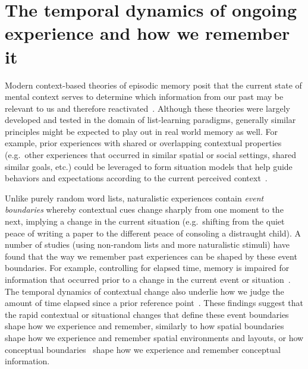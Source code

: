 \documentclass{article}
\begin{document}
\section*{The temporal dynamics of ongoing experience and how we remember it}
Modern context-based theories of episodic memory posit that the current state of mental context serves to determine which information from our past may be relevant to us and therefore reactivated~\citep[e.g.\ ][]{PolyEtal09}. Although these theories were largely developed and tested in the domain of list-learning paradigms, generally similar principles might be expected to play out in real world memory as well.  For example, prior experiences with shared or overlapping contextual properties (e.g.\ other experiences that occurred in similar spatial or social settings, shared similar goals, etc.) could be leveraged to form situation models that help guide behaviors and expectations according to the current perceived context~\citep{RangRitc12}.

Unlike purely random word lists, naturalistic experiences contain \textit{event boundaries} whereby contextual cues change sharply from one moment to the next, implying a change in the current situation (e.g.\ shifting from the quiet peace of writing a paper to the different peace of consoling a distraught child).  A number of studies (using non-random lists and more naturalistic stimuli) have found that the way we remember past experiences can be shaped by these event boundaries.  For example, controlling for elapsed time, memory is impaired for information that occurred prior to a change in the current event or situation~\citep[e.g.\ ][]{RadvCope06, SwalEtal09, SwalEtal11, EzzyDava11, MannEtal16}.  The temporal dynamics of contextual change also underlie how we judge the amount of time elapsed since a prior reference point~\citep{BlocReed78, SahaSmit14}.  These findings suggest that the rapid contextual or situational changes that define these event boundaries shape how we experience and remember, similarly to how spatial boundaries~\citep[e.g.\ environmental barriers;][]{McKeBuzs16, BrunEtal18} shape how we experience and remember spatial environments and layouts, or how conceptual boundaries~\citep[e.g.\ distinctions between semantic categories;][]{BrunEtal18} shape how we experience and remember conceptual information.
\end{document}
